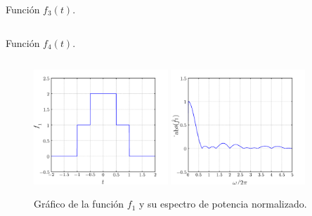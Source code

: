 \documentclass[a4paper,12pt,final]{article}
\begin{document}
      \begin{listing}[H]
        \caption{Función $f_3\left(t\right)$.}
        \label{script01E}
        \inputminted{matlab}{./laboratorio_4/p1_f3.m}
      \end{listing}\vspace{-1.0em}

      \begin{listing}[H]
        \caption{Función $f_4\left(t\right)$.}
        \label{script01F}
        \inputminted{matlab}{./laboratorio_4/p1_f4.m}
      \end{listing}\vspace{-1.0em}

      \begin{figure}[H]
        \caption{Gráfico de la función $f_1$ y su espectro de potencia normalizado.}
        \label{script01Afigure}
        \begin{center}
          \includegraphics[width=0.45\textwidth]{./laboratorio_4/problema01_f1.png}
          \includegraphics[width=0.45\textwidth]{./laboratorio_4/problema01_F1.png}
        \end{center}
      \end{figure}
\end{document}
